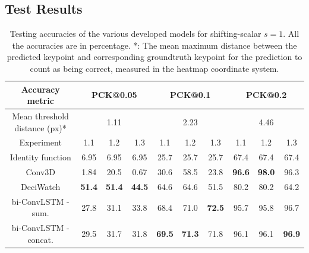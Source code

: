 \documentclass[./main.tex]{subfiles}
\begin{document}
\subsection{Test Results}
\label{subsec:pretrain_test_res}
\begin{table}[htbp]
    \begin{tabular}{c||ccc|ccc|ccc}
        \hline
        Accuracy metric & \multicolumn{3}{c}{PCK@0.05} & \multicolumn{3}{c}{PCK@0.1} & \multicolumn{3}{c}{PCK@0.2} \\
        \hline
        Mean threshold distance (px)* & \multicolumn{3}{c}{1.11} & \multicolumn{3}{c}{2.23} & \multicolumn{3}{c}{4.46} \\
        \hline
        Experiment & 1.1 & 1.2 & 1.3 & 1.1 & 1.2 & 1.3 & 1.1 & 1.2 & 1.3 \\
        \hline
        \hline
        Identity function & 6.95 & 6.95 & 6.95 & 25.7 & 25.7 & 25.7 & 67.4 & 67.4 & 67.4 \\
        Conv3D & 1.84 & 20.5 & 0.67 & 30.6 & 58.5 & 23.8 & \textbf{96.6} & \textbf{98.0} & 96.3 \\
        DeciWatch & \textbf{51.4} & \textbf{51.4} & \textbf{44.5} & 64.6 & 64.6 & 51.5 & 80.2 & 80.2 & 64.2 \\
        bi-ConvLSTM - sum. & 27.8 & 31.1 & 33.8 & 68.4 & 71.0 & \textbf{72.5} & 95.7 & 95.8 & 96.7\\
        bi-ConvLSTM - concat. & 29.5 & 31.7 & 31.8 & \textbf{69.5} & \textbf{71.3} & 71.8 & 96.1 & 96.1 & \textbf{96.9} \\
        \hline
    \end{tabular}
    \caption{Testing accuracies of the various developed models for shifting-scalar $s = 1$. All the accuracies are in percentage. *: The mean maximum distance between the predicted keypoint and corresponding groundtruth keypoint for the prediction to count as being correct, measured in the heatmap coordinate system.}
    \label{tab:pretrain_test_accs_1}
\end{table}
\end{document}
